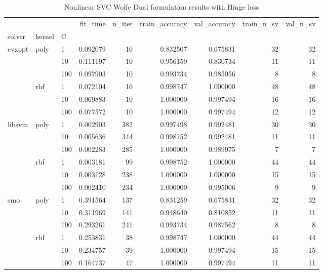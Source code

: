 \begin{table}[h!]
\centering
\caption{Nonlinear SVC Wolfe Dual formulation results with Hinge loss}
\label{nonlinear_dual_svc_cv_results}
\begin{tabular}{lllrrrrrr}
\toprule
    &     &     &  fit\_time &  n\_iter &  train\_accuracy &  val\_accuracy &  train\_n\_sv &  val\_n\_sv \\
solver & kernel & C &           &         &                 &               &             &           \\
\midrule
cvxopt & poly & 1   &  0.092079 &      10 &        0.832507 &      0.675831 &          32 &        32 \\
    &     & 10  &  0.111197 &      10 &        0.956159 &      0.830734 &          11 &        11 \\
    &     & 100 &  0.097903 &      10 &        0.993734 &      0.985056 &           8 &         8 \\
    & rbf & 1   &  0.072104 &      10 &        0.998747 &      1.000000 &          48 &        48 \\
    &     & 10  &  0.069883 &      10 &        1.000000 &      0.997494 &          16 &        16 \\
    &     & 100 &  0.077572 &      10 &        1.000000 &      0.997494 &          12 &        12 \\
libsvm & poly & 1   &  0.002903 &     382 &        0.997498 &      0.992481 &          30 &        30 \\
    &     & 10  &  0.005636 &     344 &        0.998752 &      0.992481 &          11 &        11 \\
    &     & 100 &  0.002283 &     285 &        1.000000 &      0.989975 &           7 &         7 \\
    & rbf & 1   &  0.003181 &      99 &        0.998752 &      1.000000 &          44 &        44 \\
    &     & 10  &  0.003128 &     238 &        1.000000 &      1.000000 &          15 &        15 \\
    &     & 100 &  0.002410 &     234 &        1.000000 &      0.995006 &           9 &         9 \\
smo & poly & 1   &  0.391564 &     137 &        0.831259 &      0.675831 &          32 &        32 \\
    &     & 10  &  0.311969 &     141 &        0.948640 &      0.810852 &          11 &        11 \\
    &     & 100 &  0.293261 &     241 &        0.993734 &      0.987562 &           8 &         8 \\
    & rbf & 1   &  0.253831 &      38 &        0.998747 &      1.000000 &          44 &        44 \\
    &     & 10  &  0.234757 &      39 &        1.000000 &      0.997494 &          15 &        15 \\
    &     & 100 &  0.164737 &      47 &        1.000000 &      0.997494 &          11 &        11 \\
\bottomrule
\end{tabular}
\end{table}
